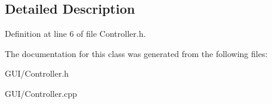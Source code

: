 \subsection{Detailed Description}


Definition at line 6 of file Controller.\+h.



The documentation for this class was generated from the following files\+:\begin{DoxyCompactItemize}
\item 
G\+U\+I/Controller.\+h\item 
G\+U\+I/Controller.\+cpp\end{DoxyCompactItemize}
